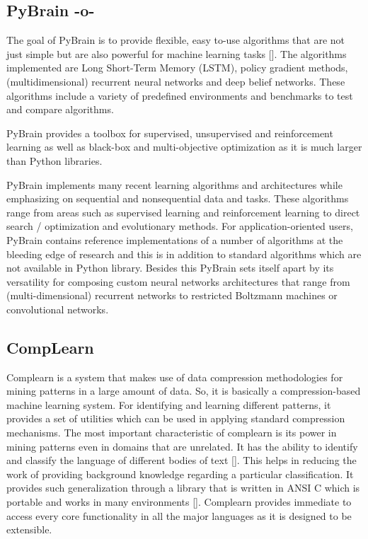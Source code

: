\subsection{PyBrain -o-}

The goal of PyBrain is to provide flexible, easy to-use algorithms
that are not just simple but are also powerful for machine learning
tasks [\cite{article-pybrain}].  The algorithms implemented are Long
Short-Term Memory (LSTM), policy gradient methods, (multidimensional)
recurrent neural networks and deep belief networks. These algorithms
include a variety of predefined environments and benchmarks to test
and compare algorithms.

PyBrain provides a toolbox for supervised, unsupervised and
reinforcement learning as well as black-box and multi-objective
optimization as it is much larger than Python libraries.

PyBrain implements many recent learning algorithms and architectures
while emphasizing on sequential and nonsequential data and
tasks. These algorithms range from areas such as supervised learning
and reinforcement learning to direct search / optimization and
evolutionary methods.  For application-oriented users, PyBrain
contains reference implementations of a number of algorithms at the
bleeding edge of research and this is in addition to standard
algorithms which are not available in Python library. Besides this
PyBrain sets itself apart by its versatility for composing custom
neural networks architectures that range from (multi-dimensional)
recurrent networks to restricted Boltzmann machines or convolutional
networks.


    
\subsection{CompLearn}

Complearn is a system that makes use of data compression methodologies
for mining patterns in a large amount of data. So, it is basically a
compression-based machine learning system. For identifying and
learning different patterns, it provides a set of utilities which can
be used in applying standard compression mechanisms. The most
important characteristic of complearn is its power in mining patterns
even in domains that are unrelated. It has the ability to identify and
classify the language of different bodies of text [\cite{comp1}]. This
helps in reducing the work of providing background knowledge regarding
a particular classification. It provides such generalization through a
library that is written in ANSI C which is portable and works in many
environments [\cite{comp1}]. Complearn provides immediate to access
every core functionality in all the major languages as it is designed
to be extensible.

